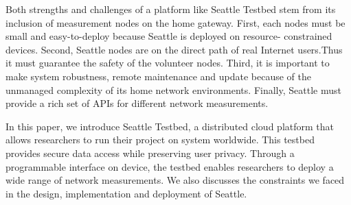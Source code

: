 Both strengths and challenges of a platform like Seattle Testbed stem from 
its inclusion of measurement nodes on the home gateway. First, each nodes 
must be small and easy-to-deploy because Seattle is deployed on resource-
constrained devices. Second, Seattle nodes are on the direct path of real 
Internet users.Thus it must guarantee the safety of the volunteer nodes. 
Third, it is important to make system robustness, remote maintenance and 
update because of the unmanaged complexity of its home network environments. 
Finally, Seattle must provide a rich set of APIs for different network 
measurements.

In this paper, we introduce Seattle Testbed, a distributed cloud platform 
that allows researchers to run their project on system worldwide. This 
testbed provides secure data access while preserving user privacy. Through a 
programmable interface on device, the testbed enables researchers to deploy 
a wide range of network measurements. We also discusses the constraints we 
faced in the design, implementation and deployment of Seattle.
